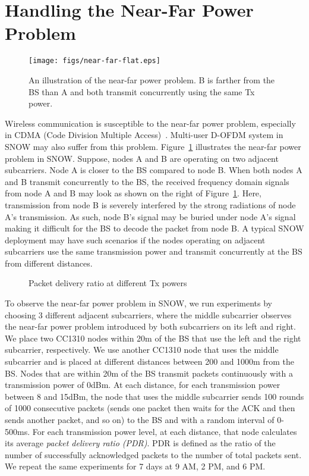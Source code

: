 \section{Handling the Near-Far Power Problem} \label{sec:near-far}
\begin{figure}[!htb]
\centering
\texttt{[image: figs/near-far-flat.eps]}
\caption{An illustration of the near-far power problem. B is farther from the BS than A and both transmit concurrently using the same Tx power.}
\label{fig:near-far}
\end{figure}
Wireless communication is susceptible to the near-far power problem, especially in CDMA (Code Division Multiple Access)~\cite{muqattash2003cdma}. Multi-user D-OFDM system in SNOW may also suffer from this problem. Figure~\ref{fig:near-far} illustrates the near-far power problem in SNOW. Suppose, nodes A and B are operating on two adjacent subcarriers. Node A is closer to the BS compared to node B. When both nodes A and B transmit concurrently to the BS, the received frequency domain signals from node A and B may look as shown on the right of Figure~\ref{fig:near-far}. Here, transmission from node B is severely interfered by the strong radiations of node A's transmission. As such, node B's signal may be buried under node A's signal making it difficult for the BS to decode the packet from node B. 
A typical SNOW deployment may have such scenarios if the nodes operating on adjacent subcarriers use the same transmission power and transmit concurrently at the BS from different distances. 
\begin{figure}[t]
    \centering 
      \hfill
    \caption{Packet delivery ratio at different Tx powers}
    \label{fig:nf-effects}
 \end{figure}


To observe the near-far power problem in SNOW, we run experiments by choosing 3 different adjacent subcarriers, where the middle subcarrier observes the near-far power problem introduced by both subcarriers on its left and right. We place two CC1310 nodes within 20m of the BS that use the left and the right subcarrier, respectively. We use another CC1310 node that uses the middle subcarrier and is placed at different distances between 200 and 1000m from the BS. Nodes that are within 20m of the BS transmit packets continuously with a transmission power of 0dBm. At each distance, for each transmission power between 8 and 15dBm, the node that uses the middle subcarrier sends 100 rounds of 1000 consecutive packets (sends one packet then waits for the ACK and then sends another packet, and so on) to the BS and with a random interval of 0-500ms. For each transmission power level, at each distance, that node calculates its average {\em packet delivery ratio (PDR)}. PDR is defined as the ratio of the number of successfully acknowledged packets to the number of total packets sent.
We repeat the same experiments for 7 days at 9 AM, 2 PM, and 6 PM.

